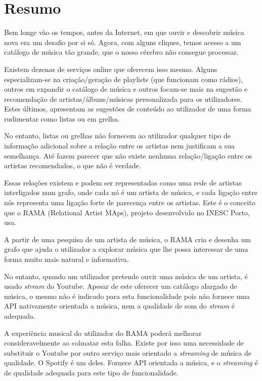 
\chapter*{Resumo}

Bem longe vão os tempos, antes da Internet, em que ouvir e descobrir música nova era um desafio por si só.
Agora, com alguns cliques, temos acesso a um catálogo de música tão grande, que o nosso cérebro não consegue processar.

Existem dezenas de serviços online que oferecem isso mesmo.
Alguns especializam-se na criação/geração de playlists (que funcionam como rádios), outros em expandir o catálogo de música e outros focam-se mais na sugestão e recomendação de artistas/álbuns/músicas personalizada para os utilizadores.
Estes últimos, apresentam as sugestões de conteúdo ao utilizador de uma forma rudimentar como listas ou em grelha.

No entanto, listas ou grelhas não fornecem ao utilizador qualquer tipo de informação adicional sobre a relação entre os artistas nem justificam a sua semelhança.
Até fazem parecer que não existe nenhuma relação/ligação entre os artistas recomendados, o que não é verdade.

Essas relações existem e podem ser representadas como uma rede de artistas interligados num grafo, onde cada nó é um artista de música, e cada ligação entre nós representa uma ligação forte de parecença entre os artistas.
Este é o conceito que o RAMA (Relational Artist MAps), projeto desenvolvido no INESC Porto, usa.

A partir de uma pesquisa de um artista de música, o RAMA cria e desenha um grafo que ajuda o utilizador a explorar música que lhe possa interessar de uma forma muito mais natural e informativa.

No entanto, quando um utilizador pretende ouvir uma música de um artista, é usado \emph{stream} do Youtube. 
Apesar de este oferecer um catálogo alargado de música, o mesmo não é indicado para esta funcionalidade pois não fornece uma API nativamente orientada a música, nem a qualidade de som do \emph{stream} é adequada.

A experiência musical do utilizador do RAMA poderá melhorar consideravelmente ao colmatar esta falha.
Existe por isso uma necessidade de substituir o Youtube por outro serviço mais orientado a \emph{streaming} de música de qualidade.
O Spotify é um deles. Fornece API orientada a música, e o \emph{streaming} é de qualidade adequada para este tipo de funcionalidade.

